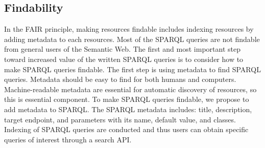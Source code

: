 \documentclass[runningheads]{llncs}
\begin{document}






\subsection{Findability}

In the FAIR principle, making resources findable includes indexing resources by adding metadata to each resources. 
Most of the SPARQL queries are not findable from general users of the Semantic Web. 
The first and most important step toward increased value of the written SPARQL queries is to consider how to make SPARQL queries findable.
The first step is using metadata to find SPARQL queries. 
Metadata should be easy to find for both humans and computers. Machine-readable metadata are essential for automatic discovery of resources, so this is essential component.
To make SPARQL queries findable, we propose to add metadata to SPARQL.
The SPARQL metadata includes: title, description, target endpoint, and parameters with its name, default value, and classes.
Indexing of SPARQL queries are conducted and thus users can obtain specific queries of interest through a search API.
\end{document}
